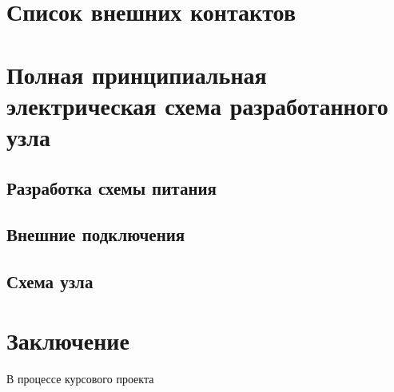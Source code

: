 \documentclass[a4paper,14pt,russian]{article}
\begin{document}
\section{Список внешних контактов}


\section{Полная принципиальная электрическая схема разработанного узла}
\subsection{Разработка схемы питания}

\subsection{Внешние подключения}

\subsection{Схема узла}

\section*{Заключение}
В процессе курсового проекта

\renewcommand\refname{Список использованных источников}
\nocite{*}


\clearpage
\appendix
\end{document}
